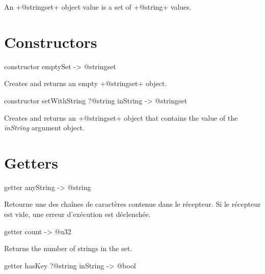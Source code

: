 



An \ggsq+@stringset+ object value is a set of \ggsq+@string+ values.\\

\section{Constructors}


\begin{galgas4}
constructor emptySet -> @stringset
\end{galgas4}


Creates and returns an empty \ggsq+@stringset+ object.


\begin{galgas4}
constructor setWithString ?@string inString -> @stringset
\end{galgas4}


Creates and returns an \ggsq+@stringset+ object that contains the value of the \emph{inString} argument object.

\section{Getters}




\begin{galgas4}
getter anyString -> @string
\end{galgas4}

Retourne une des chaînes de caractères contenue dans le récepteur. Si le récepteur est vide, une erreur d'exécution est déclenchée.

\begin{galgas4}
getter count -> @u32
\end{galgas4}

Returns the number of strings in the set.




\begin{galgas4}
getter hasKey ?@string inString -> @bool
\end{galgas4}

